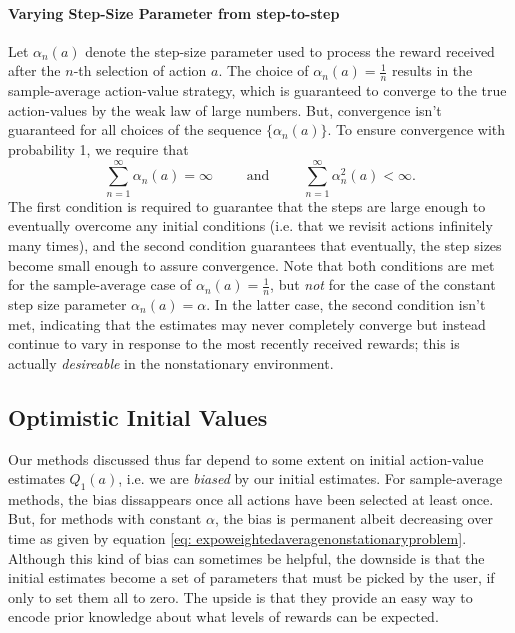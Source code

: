 \documentclass[12pt]{article}
\begin{document}
\paragraph{Varying Step-Size Parameter from step-to-step} Let $\alpha_n(a)$ denote the step-size parameter used to process the reward received after the $n$-th selection of action $a$. The choice of $\alpha_n(a) = \frac{1}{n}$ results in the sample-average action-value strategy, which is guaranteed to converge to the true action-values by the weak law of large numbers. But, convergence isn't guaranteed for all choices of the sequence $\{\alpha_n(a)\}$. To ensure convergence with probability 1, we require that
\begin{equation}
  \label{eq: conditionsrequiredtoassureconvergencewithprobabilityone}
  \sum_{n=1}^{\infty} \alpha_n(a) = \infty \hspace{25pt} \textrm{ and } \hspace{25pt} \sum_{n=1}^{\infty} \alpha_n^2(a) < \infty.
\end{equation}
The first condition is required to guarantee that the steps are large enough to eventually overcome any initial conditions (i.e. that we revisit actions infinitely many times), and the second condition guarantees that eventually, the step sizes become small enough to assure convergence. Note that both conditions are met for the sample-average case of $\alpha_n(a) = \frac{1}{n}$, but \emph{not} for the case of the constant step size parameter $\alpha_n(a) = \alpha$. In the latter case, the second condition isn't met, indicating that the estimates may never completely converge but instead continue to vary in response to the most recently received rewards; this is actually \emph{desireable} in the nonstationary environment.

\subsection{Optimistic Initial Values} Our methods discussed thus far depend to some extent on initial action-value estimates $Q_1(a)$, i.e. we are \emph{biased} by our initial estimates. For sample-average methods, the bias dissappears once all actions have been selected at least once. But, for methods with constant $\alpha$, the bias is permanent albeit decreasing over time as given by equation \ref{eq: expoweightedaveragenonstationaryproblem}. Although this kind of bias can sometimes be helpful, the downside is that the initial estimates become a set of parameters that must be picked by the user, if only to set them all to zero. The upside is that they provide an easy way to encode prior knowledge about what levels of rewards can be expected.
\end{document}
